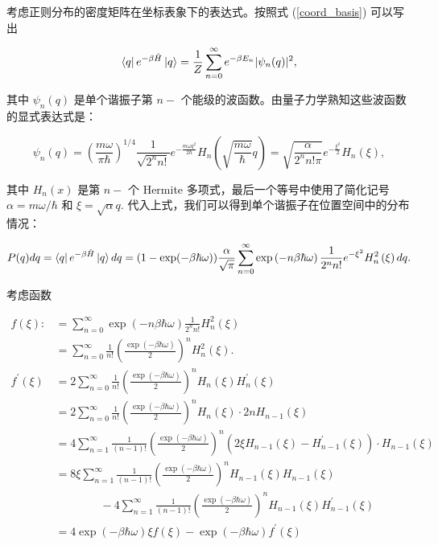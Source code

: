考虑正则分布的密度矩阵在坐标表象下的表达式。按照式 (\ref{coord_basis}) 可以写出
\begin{linenomath}\begin{equation}
    \bra{q} e^{-\beta \hat{H}} \ket{q} = \frac1Z\sum_{n=0}^\infty e^{-\beta E_n} |\psi_n(q)|^2,
\end{equation}\end{linenomath}
其中 $\psi_n(q)$ 是单个谐振子第 $n-$ 个能级的波函数。由量子力学熟知这些波函数的显式表达式是：
\begin{linenomath}\begin{equation}
    \psi_n(q) = \left( \frac{m\omega}{\pi \hbar} \right)^{1/4} \frac{1}{\sqrt{2^n n!}} e^{-\frac{m\omega q^2}{2\hbar}} H_n\left( \sqrt{\frac{m\omega}{\hbar}} q \right) = \sqrt{\frac{\alpha}{2^n n!\pi}} e^{-\frac{\xi^2}{2}} H_n\left( \xi \right),
\end{equation}\end{linenomath}
其中 $H_n(x)$ 是第 $n-$ 个 Hermite 多项式，最后一个等号中使用了简化记号 $\alpha = m\omega/\hbar$ 和 $\xi = \sqrt{\alpha} q.$ 代入上式，我们可以得到单个谐振子在位置空间中的分布情况：
\begin{linenomath}\begin{equation}
    P(q) dq = \bra{q} e^{-\beta \hat{H}} \ket{q} dq = (1-\exp(-\beta\hbar \omega))\frac{\alpha}{\sqrt{\pi}} \sum_{n=0}^\infty \exp\left( -n\beta\hbar\omega \right)\frac{1}{2^n n!} e^{-\xi^2} H_n^2\left( \xi \right) dq.
\end{equation}\end{linenomath}
考虑函数
\begin{linenomath}
    \begin{align}
        f(\xi):&=\sum_{n=0}^\infty \exp\left( -n\beta\hbar\omega \right)\frac{1}{2^n n!} H_n^2\left( \xi \right)\\
        &=\sum_{n=0}^\infty \frac{1}{n!}\left(  \frac{\exp(-\beta\hbar\omega)}{2} \right)^n  H_n^2\left( \xi \right).\\
        f^\prime(\xi) &= 2\sum_{n=0}^{\infty} \frac{1}{n!}\left(  \frac{\exp(-\beta\hbar\omega)}{2} \right)^n H_n\left( \xi \right)H_n^\prime\left( \xi \right) \\
        &= 2\sum_{n=0}^{\infty}\frac{1}{n!} \left(  \frac{\exp(-\beta\hbar\omega)}{2} \right)^n H_n\left( \xi \right) \cdot 2n H_{n-1}\left( \xi \right) \\
        &= 4\sum_{n=1}^{\infty} \frac{1}{\left( n-1 \right)!}\left(  \frac{\exp(-\beta\hbar\omega)}{2} \right)^n \left( 2\xi H_{n-1}\left( \xi \right) - H_{n-1}^\prime\left( \xi \right)\right) \cdot  H_{n-1}\left( \xi \right) \\
        &= 8\xi\sum_{n=1}^{\infty} \frac{1}{\left( n-1 \right)!}\left(  \frac{\exp(-\beta\hbar\omega)}{2} \right)^n  H_{n-1}\left( \xi \right)H_{n-1}\left( \xi \right) \\&\quad\quad\qquad- 4\sum_{n=1}^{\infty} \frac{1}{\left( n-1 \right)!}\left(  \frac{\exp(-\beta\hbar\omega)}{2} \right)^n H_{n-1}\left( \xi \right)H_{n-1}^{\prime}\left( \xi \right) \\
        &= 4\exp(-\beta\hbar\omega) \xi f\left( \xi \right) - \exp(-\beta\hbar\omega) f^\prime\left( \xi \right) 
    \end{align}
\end{linenomath}

